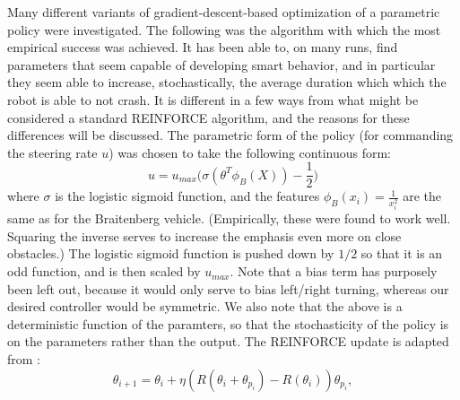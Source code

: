 \documentclass{article}
\begin{document}
Many different variants of gradient-descent-based optimization of a parametric policy were investigated.  The following was the algorithm with which the most empirical success was achieved.  It has been able to, on many runs, find parameters that seem capable of developing smart behavior, and in particular they seem able to increase, stochastically, the average duration which which the robot is able to not crash.  It is different in a few ways from what might be considered a standard REINFORCE algorithm, and the reasons for these differences will be discussed.  The parametric form of the policy (for commanding the steering rate $u$) was chosen to take the following continuous form: 
%
%
\begin{equation}
\label{u_continuous}
u = u_{max} \bigg(\sigma(\theta^T \phi_B(X)) - \frac{1}{2}\bigg) 
\end{equation}
%
%
where $\sigma$ is the logistic sigmoid function, and the features $\phi_B(x_i) = \frac{1}{x_i^2}$ are the same as for the Braitenberg vehicle.  (Empirically, these were found to work well.  Squaring the inverse serves to increase the emphasis even more on close obstacles.)  The logistic sigmoid function is pushed down by $1/2$ so that it is an odd function, and is then scaled by $u_{max}$.  Note that a bias term has purposely been left out, because it would only serve to bias left/right turning, whereas our desired controller would be symmetric.  We also note that the above is a deterministic function of the paramters, so that the stochasticity of the policy is on the parameters rather than the output.  The REINFORCE update is adapted from :
%
%
\begin{equation}
\theta_{i+1} = \theta_i + \eta (R(\theta_i + \theta_{p_i}) - R(\theta_i)) \theta_{p_i},
\end{equation}
%
%
\end{document}
